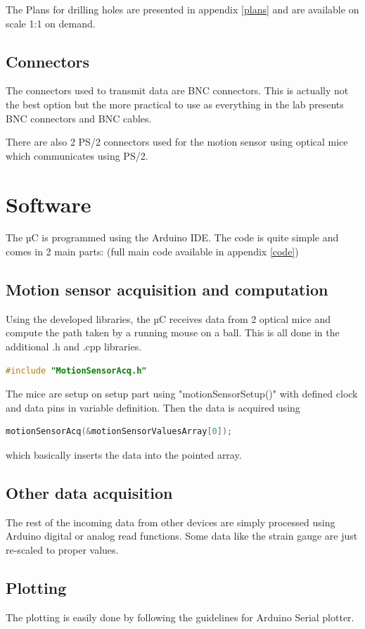 \documentclass[a4paper]{article}
\begin{document}
The Plans for drilling holes are presented in appendix \ref{plans} and are available on scale 1:1 on demand.

\subsection{Connectors}
The connectors used to transmit data are BNC connectors. This is actually not the best option but the more practical to use as everything in the lab presents BNC connectors and BNC cables.

There are also 2 PS/2 connectors used for the motion sensor using optical mice which communicates using PS/2.

\section{Software}
The µC is programmed using the Arduino IDE.
The code is quite simple and comes in 2 main parts:
(full main code available in appendix \ref{code})
\subsection{Motion sensor acquisition and computation}
Using the developed libraries, the µC receives data from 2 optical mice and compute the path taken by a running mouse on a ball.
This is all done in the additional .h and .cpp libraries.
\begin{lstlisting}[language=C++]
#include "MotionSensorAcq.h"
\end{lstlisting}

The mice are setup on setup part using "motionSensorSetup()" with defined clock and data pins in variable definition. Then the data is acquired using
\begin{lstlisting}[language=C++]
motionSensorAcq(&motionSensorValuesArray[0]);
\end{lstlisting}
which basically inserts the data into the pointed array.

\subsection{Other data acquisition}
The rest of the incoming data from other devices are simply processed using Arduino digital or analog read functions. Some data like the strain gauge are just re-scaled to proper values.

\subsection{Plotting}
The plotting is easily done by following the guidelines for Arduino Serial plotter.
\end{document}
